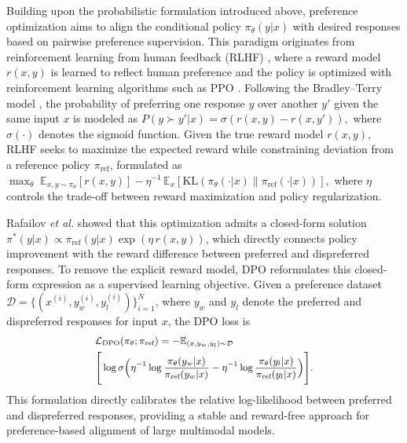 Building upon the probabilistic formulation introduced above, preference optimization aims to align the conditional policy $\pi_{\theta}(y|x)$ with desired responses based on pairwise preference supervision. 
This paradigm originates from reinforcement learning from human feedback (RLHF) \cite{Christiano2017RLHF}, 
where a reward model $r(x,y)$ is learned to reflect human preference and the policy is optimized with reinforcement learning algorithms such as PPO \cite{Schulman2017PPO}. 
Following the Bradley--Terry model \cite{Bradley1952BT}, the probability of preferring one response $y$ over another $y'$ given the same input $x$ is modeled as
$
P(y \succ y'|x) = \sigma(r(x,y) - r(x,y')) ,
$
where $\sigma(\cdot)$ denotes the sigmoid function. 
Given the true reward model $r(x,y)$, RLHF seeks to maximize the expected reward while constraining deviation from a reference policy $\pi_{\text{ref}}$, formulated as $
\max_{\theta} \; \mathbb{E}_{x,y\sim\pi_\theta} [r(x,y)] - \eta^{-1} \, \mathbb{E}_{x} [\mathrm{KL}(\pi_\theta(\cdot|x) \| \pi_{\text{ref}}(\cdot|x))],
$
where $\eta$ controls the trade-off between reward maximization and policy regularization. 


Rafailov \textit{et al.} \cite{rafailov2023direct} showed that this optimization admits a closed-form solution $
\pi^{*}(y|x) \propto \pi_{\text{ref}}(y|x)\exp(\eta\, r(x,y))$,
which directly connects policy improvement with the reward difference between preferred and dispreferred responses. To remove the explicit reward model, DPO reformulates this closed-form expression as a supervised learning objective. 
Given a preference dataset $\mathcal{D}=\{(x^{(i)},y_w^{(i)},y_l^{(i)})\}_{i=1}^{N}$, where $y_w$ and $y_l$ denote the preferred and dispreferred responses for input $x$, the DPO loss is
\begin{equation}
\small
\begin{aligned}
&\mathcal{L}_{\text{DPO}}(\pi_\theta; \pi_{\text{ref}}) 
= -\mathbb{E}_{(x,y_w,y_l)\sim\mathcal{D}} \\&\Bigg[
\log \sigma \Big(
\eta^{-1} \log \frac{\pi_\theta(y_w|x)}{\pi_{\text{ref}}(y_w|x)}
- \eta^{-1} \log \frac{\pi_\theta(y_l|x)}{\pi_{\text{ref}}(y_l|x)}
\Big) \Bigg].
\end{aligned}
\label{eq:dpo_loss}
\end{equation}
This formulation directly calibrates the relative log-likelihood between preferred and dispreferred responses, providing a stable and reward-free approach for preference-based alignment of large multimodal models.

